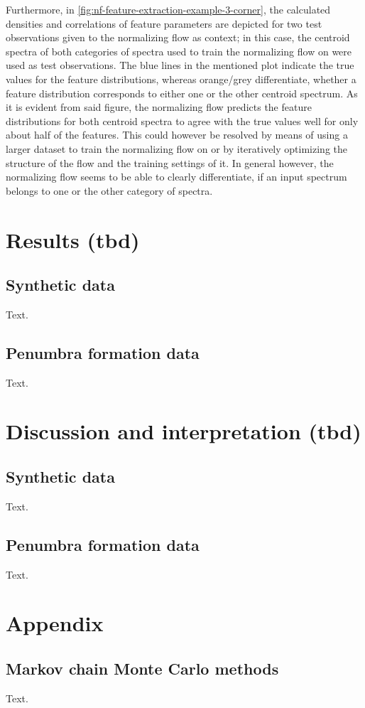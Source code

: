 \documentclass[a4paper,12pt]{report}
\begin{document}
Furthermore, in \cref{fig:nf-feature-extraction-example-3-corner}, the calculated densities and correlations of feature parameters are depicted for two test observations given to the normalizing flow as context; in this case, the centroid spectra of both categories of spectra used to train the normalizing flow on were used as test observations. The blue lines in the mentioned plot indicate the true values for the feature distributions, whereas orange/grey differentiate, whether a feature distribution corresponds to either one or the other centroid spectrum. As it is evident from said figure, the normalizing flow predicts the feature distributions for both centroid spectra to agree with the true values well for only about half of the features. This could however be resolved by means of using a larger dataset to train the normalizing flow on or by iteratively optimizing the structure of the flow and the training settings of it. In general however, the normalizing flow seems to be able to clearly differentiate, if an input spectrum belongs to one or the other category of spectra.

\FloatBarrier

\chapter{Results (tbd)}\label{chap:results}
\section{Synthetic data}
Text. %

\section{Penumbra formation data}
Text. %

\chapter{Discussion and interpretation (tbd)}\label{chap:discussion}
\section{Synthetic data}
Text.

\section{Penumbra formation data}
Text.

\chapter{Appendix}
\section{Markov chain Monte Carlo methods}
Text. %




\end{document}
